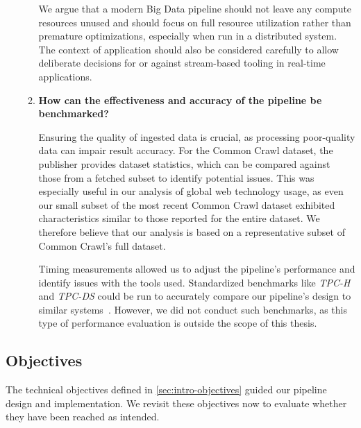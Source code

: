 \begin{enumerate}
\begin{enumerate}
        We argue that a modern Big Data pipeline should not leave any compute resources unused and should focus on full resource utilization rather than premature optimizations, especially when run in a distributed system.
        The context of application should also be considered carefully to allow deliberate decisions for or against stream-based tooling in real-time applications.

        \medskip
        \item[] \textbf{ How can the effectiveness and accuracy of the pipeline be benchmarked?}

        Ensuring the quality of ingested data is crucial, as processing poor-quality data can impair result accuracy.
        For the Common Crawl dataset, the publisher provides dataset statistics, which can be compared against those from a fetched subset to identify potential issues.
        This was especially useful in our analysis of global web technology usage, as even our small subset of the most recent Common Crawl dataset exhibited characteristics similar to those reported for the entire dataset.
        We therefore believe that our analysis is based on a representative subset of Common Crawl's full dataset.

        Timing measurements allowed us to adjust the pipeline's performance and identify issues with the tools used.
        Standardized benchmarks like \textit{TPC-H} and \textit{TPC-DS} could be run to accurately compare our pipeline's design to similar systems~\cite{Bajaber2020, Ivanov2020}.
        However, we did not conduct such benchmarks, as this type of performance evaluation is outside the scope of this thesis.
    \end{enumerate}
\end{enumerate}

\subsection{Objectives}
\label{sec:evaluation-objectives}

The technical objectives defined in \cref{sec:intro-objectives} guided our pipeline design and implementation.
We revisit these objectives now to evaluate whether they have been reached as intended.

